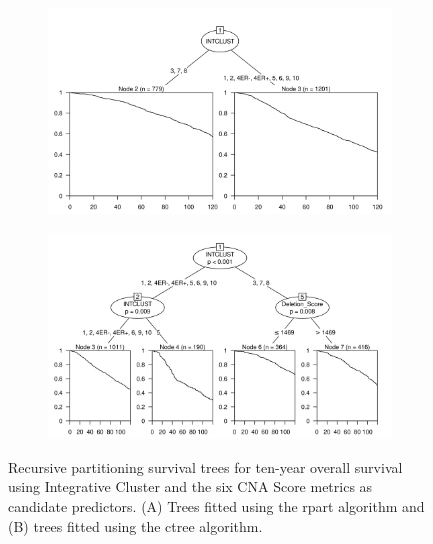 \begin{figure}[!htb]
\centering

\vspace{0.5cm}

\begin{subfigure}{\textwidth}
\subcaption{}
\includegraphics[width=1\textwidth]{../figures/Appendices/Appendix_B/PartyKit_Survival_Score_TenYearOS_INTCLUST.png}
\end{subfigure}

\vspace{2cm}

\begin{subfigure}{\textwidth}
\subcaption{}
\includegraphics[width=1\textwidth]{../figures/Appendices/Appendix_B/Ctree_Survival_Score_TenYearOS_INTCLUST.png}
\end{subfigure}

\vspace{0.5cm}

\caption[Recursive partitioning survival trees for ten-year overall survival using Integrative Cluster and the six CNA Score metrics as candidate predictors.]{Recursive partitioning survival trees for ten-year overall survival using Integrative Cluster and the six CNA Score metrics as candidate predictors. (A) Trees fitted using the rpart algorithm and (B) trees fitted using the ctree algorithm.}
\end{figure}

